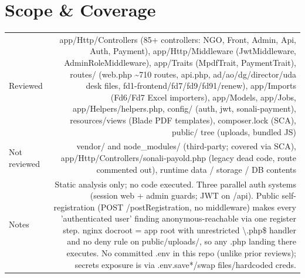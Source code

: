 \documentclass[11pt,a4paper]{article}
\begin{document}
\section*{Scope \& Coverage}
{\renewcommand{\arraystretch}{1.35}%
\begin{tabularx}{\textwidth}{L R}
\toprule
Reviewed & app/Http/Controllers (85+ controllers: NGO, Front, Admin, Api, Auth, Payment), app/Http/Middleware (JwtMiddleware, AdminRoleMiddleware), app/Traits (MpdfTrait, PaymentTrait), routes/ (web.php \textasciitilde{}710 routes, api.php, ad/ao/dg/director/uda desk files, fd1-frontend/fd7/fd9/fd91/renew), app/Imports (Fd6/Fd7 Excel importers), app/Models, app/Jobs, app/Helpers/helpers.php, config/ (auth, jwt, sonali-payment), resources/views (Blade PDF templates), composer.lock (SCA), public/ tree (uploads, bundled JS) \\
Not reviewed & vendor/ and node\_modules/ (third-party; covered via SCA), app/Http/Controllers/sonali-payold.php (legacy dead code, route commented out), runtime data / storage / DB contents \\
Notes & Static analysis only; no code executed. Three parallel auth systems (session web + admin guards; JWT on /api). Public self-registration (POST /postRegistration, no middleware) makes every 'authenticated user' finding anonymous-reachable via one register step. nginx docroot = app root with unrestricted \textbackslash{}.php\$ handler and no deny rule on public/uploads/, so any .php landing there executes. No committed .env in this repo (unlike prior reviews); secrets exposure is via .env.save*/swap files/hardcoded creds. \\
\bottomrule
\end{tabularx}}
\end{document}
